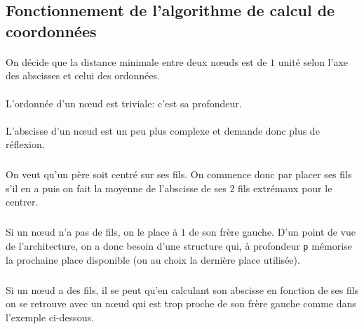 	\subsection{Fonctionnement de l'algorithme de calcul de coordonnées}

\paragraph{}On décide que la distance minimale entre deux n\oe uds est de $1$ unité selon l'axe des abscisses et celui des ordonnées.

\paragraph{}L'ordonnée d'un n\oe ud est triviale: c'est sa profondeur.

\paragraph{}L’abscisse d'un n\oe ud est un peu plus complexe et demande donc plus de réflexion. 

\subparagraph{}On veut qu'un père soit centré sur ses fils. On commence donc par placer ses fils s'il en a puis on fait la moyenne de l'abscisse de ses $2$ fils extrémaux pour le centrer. 

\subparagraph{}Si un n\oe ud n'a pas de fils, on le place à $1$ de son frère gauche. D'un point de vue de l'architecture, on a donc besoin d'une structure qui, à profondeur \verb|p| mémorise la prochaine place disponible (ou au choix la dernière place utilisée).

\subparagraph{}Si un n\oe ud a des fils, il se peut qu'en calculant son abscisse en fonction de ses fils on se retrouve avec un n\oe ud qui est trop proche de son frère gauche comme dans l'exemple ci-dessous. 

